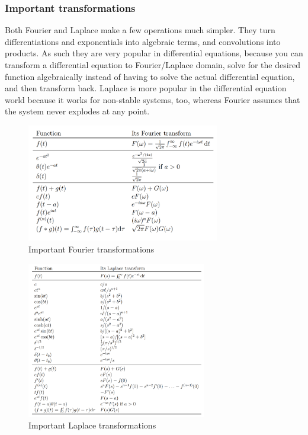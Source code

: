 \subsubsection{Important transformations}
Both Fourier and Laplace make a few operations much simpler. 
They turn differentiations and exponentials into algebraic terms, and convolutions into products.
As such they are very popular in differential equations,
because you can transform a differential equation to Fourier/Laplace domain, solve for the desired function algebraically
instead of having to solve the actual differential equation, and then transform back.
Laplace is more popular in the differential equation world because it works for non-stable systems, too,
whereas Fourier assumes that the system never explodes at any point.

\begin{figure}[h]
  \caption{Important Fourier transformations}
  \centering
    \includegraphics[width=0.75\textwidth]{images/fourier_transforms.png}
\end{figure}

\begin{figure}[h]
    \caption{Important Laplace transformations}
    \centering
      \includegraphics[width=0.7\textwidth]{images/laplace_transforms.png}
\end{figure}


